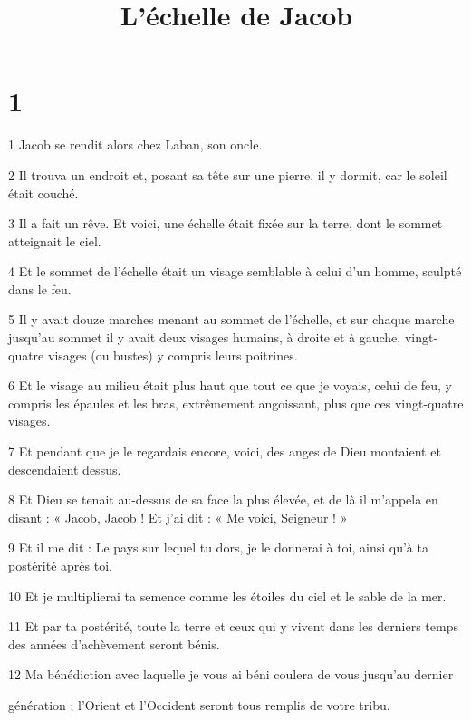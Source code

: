 


\title{L'échelle de Jacob}

\chapter{1}

\par 1 Jacob se rendit alors chez Laban, son oncle.

\par 2 Il trouva un endroit et, posant sa tête sur une pierre, il y dormit, car le soleil était couché.

\par 3 Il a fait un rêve. Et voici, une échelle était fixée sur la terre, dont le sommet atteignait le ciel.

\par 4 Et le sommet de l'échelle était un visage semblable à celui d'un homme, sculpté dans le feu.

\par 5 Il y avait douze marches menant au sommet de l'échelle, et sur chaque marche jusqu'au sommet il y avait deux visages humains, à droite et à gauche, vingt-quatre visages (ou bustes) y compris leurs poitrines.

\par 6 Et le visage au milieu était plus haut que tout ce que je voyais, celui de feu, y compris les épaules et les bras, extrêmement angoissant, plus que ces vingt-quatre visages.

\par 7 Et pendant que je le regardais encore, voici, des anges de Dieu montaient et descendaient dessus.

\par 8 Et Dieu se tenait au-dessus de sa face la plus élevée, et de là il m'appela en disant : « Jacob, Jacob ! Et j’ai dit : « Me voici, Seigneur ! »

\par 9 Et il me dit : Le pays sur lequel tu dors, je le donnerai à toi, ainsi qu'à ta postérité après toi.

\par 10 Et je multiplierai ta semence comme les étoiles du ciel et le sable de la mer.

\par 11 Et par ta postérité, toute la terre et ceux qui y vivent dans les derniers temps des années d'achèvement seront bénis.

\par 12 Ma bénédiction avec laquelle je vous ai béni coulera de vous jusqu'au dernier
\par génération ; l’Orient et l’Occident seront tous remplis de votre tribu.

